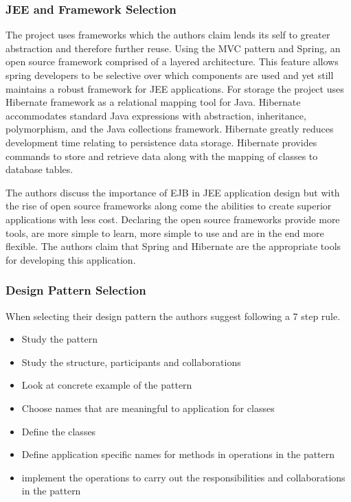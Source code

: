 									\subsubsection{JEE and Framework Selection}
									The project uses frameworks which the authors claim lends its self to greater abstraction and therefore further reuse. Using the MVC\cite{MVC} pattern and Spring, an open source framework comprised of a layered architecture. This feature allows spring developers to be selective over which components are used and yet still maintains a robust framework for JEE applications. For storage the project uses Hibernate framework as a relational mapping tool for Java. Hibernate accommodates standard Java expressions with abstraction, inheritance, polymorphism, and the Java collections framework. Hibernate greatly reduces development time relating to persistence data storage. Hibernate provides commands to store and retrieve data along with the mapping of classes to database tables.
									
									The authors discuss the importance of EJB in JEE application design but with the rise of open source frameworks along come the abilities to create superior applications with less cost. Declaring the open source frameworks provide more tools, are more simple to learn, more simple to use and are in the end more flexible. The authors claim that Spring and Hibernate are the appropriate tools for developing this application.
									
									\subsubsection{Design Pattern Selection}
									When selecting their design pattern the authors suggest following a 7 step rule.
									\begin{itemize}
										\item Study the pattern
										\item Study the structure, participants  and collaborations 
										\item Look at concrete example of the pattern
										\item Choose names that are meaningful to application for classes
										\item Define the classes
										\item Define application specific names for methods in operations in the pattern
										\item implement the operations to carry out the responsibilities and collaborations in the pattern
										\end{itemize}
										
